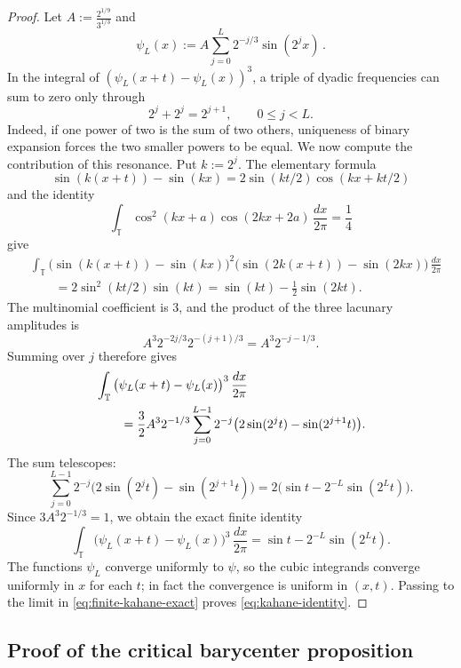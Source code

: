 \documentclass[11pt]{amsart}
\theoremstyle{definition}
\theoremstyle{remark}
\newcommand{\T}{\mathbb T}
\begin{document}
\begin{proof}
Let $A:= \frac{2^{1/9}}{3^{1/3}}$ and
\[
 \psi_L(x):=A\sum_{j=0}^L2^{-j/3}\sin(2^j x) \,.
\]
In the integral of $(\psi_L(x+t)-\psi_L(x))^3$, a triple of dyadic frequencies can sum to zero only through
\[
 2^j+2^j=2^{j+1},
 \qquad 0\leq j<L.
\]
Indeed, if one power of two is the sum of two others, uniqueness of binary expansion forces the two smaller powers to be equal.  We now compute the contribution of this resonance.  Put $k:=2^j$.  The elementary formula
\[
 \sin(k(x+t))-\sin(kx)
 =2\sin(kt/2)\cos(kx+kt/2)
\]
and the identity
\[
 \int_\T\cos^2(kx+a)\cos(2kx+2a)\,\frac{dx}{2\pi}=\frac14
\]
give
\begin{align*}
 &\int_\T
 \big(\sin(k(x+t))-\sin(kx)\big)^2
 \big(\sin(2k(x+t))-\sin(2kx)\big)\,\frac{dx}{2\pi}\\
 &\qquad=2\sin^2(kt/2)\sin(kt)
 =\sin(kt)-\frac12\sin(2kt).
\end{align*}
The multinomial coefficient is $3$, and the product of the three lacunary amplitudes is
\[
 A^3 2^{-2j/3}2^{-(j+1)/3}=A^3 2^{-j-1/3}.
\]
Summing over $j$ therefore gives
\begin{align}
 &\int_\T
 \big(\psi_L(x+t)-\psi_L(x)\big)^3\,\frac{dx}{2\pi}\notag\\
 &\qquad=\frac32A^3 2^{-1/3}
 \sum_{j=0}^{L-1}2^{-j}
 \big(2\sin(2^j t)-\sin(2^{j+1}t)\big).\label{eq:finite-kahane}
\end{align}
The sum telescopes:
\[
 \sum_{j=0}^{L-1}2^{-j}
 \big(2\sin(2^j t)-\sin(2^{j+1}t)\big)
 =2\big(\sin t-2^{-L}\sin(2^L t)\big).
\]
Since $3A^3 2^{-1/3}=1$, we obtain the exact finite identity
\begin{equation}\label{eq:finite-kahane-exact}
 \int_\T
 \big(\psi_L(x+t)-\psi_L(x)\big)^3\,\frac{dx}{2\pi}
 =\sin t-2^{-L}\sin(2^L t).
\end{equation}
The functions $\psi_L$ converge uniformly to $\psi$, so the cubic integrands converge uniformly in $x$ for each $t$; in fact the convergence is uniform in $(x,t)$.  Passing to the limit in \eqref{eq:finite-kahane-exact} proves \eqref{eq:kahane-identity}.
\end{proof}


\subsection{Proof of the critical barycenter proposition}
\end{document}
